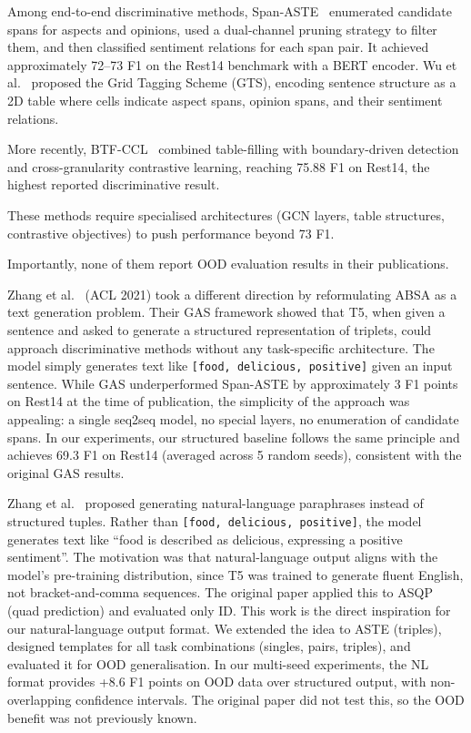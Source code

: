 \documentclass[12pt,a4paper]{report}
\begin{document}
Among end-to-end discriminative methods, Span-ASTE~\cite{xu2021learning} enumerated candidate spans 
for aspects and opinions, used a dual-channel pruning strategy to filter them, and then classified 
sentiment relations for each span pair. It achieved approximately 72--73 F1 on the Rest14 benchmark 
with a BERT encoder. Wu et al.~\cite{wu2020grid} proposed the Grid Tagging Scheme (GTS), encoding 
sentence structure as a 2D table where cells indicate aspect spans, opinion spans, and their sentiment 
relations. 

More recently, BTF-CCL~\cite{btfccl2025} combined table-filling with boundary-driven 
detection and cross-granularity contrastive learning, reaching 75.88 F1 on Rest14, the highest 
reported discriminative result. 

These methods require specialised architectures (GCN layers, table 
structures, contrastive objectives) to push performance beyond 73 F1. 

Importantly, none of them report OOD evaluation results in their publications.

Zhang et al.~\cite{zhang2021towards} (ACL 2021) took a different direction by reformulating ABSA as a text generation problem. Their GAS framework showed that T5, when given a sentence and asked to generate a structured representation of triplets, could approach discriminative methods without any task-specific architecture. The model simply generates text like \texttt{[food, delicious, positive]} given an input sentence. While GAS underperformed Span-ASTE by approximately 3 F1 points on Rest14 at the time of publication, the simplicity of the approach was appealing: a single seq2seq model, no special layers, no enumeration of candidate spans. In our experiments, our structured baseline follows the same principle and achieves 69.3 F1 on Rest14 (averaged across 5 random seeds), consistent with the original GAS results.

Zhang et al.~\cite{zhang2021aspect} proposed generating natural-language paraphrases instead of structured tuples. Rather than \texttt{[food, delicious, positive]}, the model generates text like ``food is described as delicious, expressing a positive sentiment''. The motivation was that natural-language output aligns with the model's pre-training distribution, since T5 was trained to generate fluent English, not bracket-and-comma sequences. The original paper applied this to ASQP (quad prediction) and evaluated only ID. This work is the direct inspiration for our natural-language output format. We extended the idea to ASTE (triples), designed templates for all task combinations (singles, pairs, triples), and evaluated it for OOD generalisation. In our multi-seed experiments, the NL format provides +8.6 F1 points on OOD data over structured output, with non-overlapping confidence intervals. The original paper did not test this, so the OOD benefit was not previously known.
\end{document}

